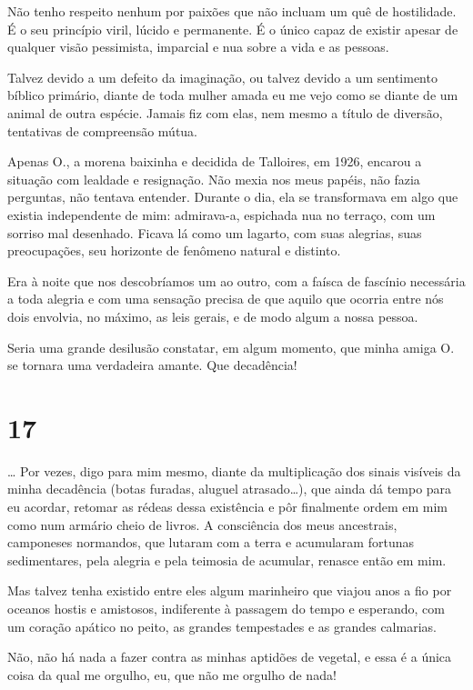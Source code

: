 Não tenho respeito nenhum por paixões que não incluam um quê de
hostilidade. É o seu princípio viril, lúcido e permanente. É o único
capaz de existir apesar de qualquer visão pessimista, imparcial e nua
sobre a vida e as pessoas.

Talvez devido a um defeito da imaginação, ou talvez devido a um
sentimento bíblico primário, diante de toda mulher amada eu me vejo como
se diante de um animal de outra espécie. Jamais fiz com elas, nem mesmo
a título de diversão, tentativas de compreensão mútua.

Apenas O., a morena baixinha e decidida de Talloires, em 1926, encarou a
situação com lealdade e resignação. Não mexia nos meus papéis, não fazia
perguntas, não tentava entender. Durante o dia, ela se transformava em
algo que existia independente de mim: admirava-a, espichada nua no
terraço, com um sorriso mal desenhado. Ficava lá como um lagarto, com
suas alegrias, suas preocupações, seu horizonte de fenômeno natural e
distinto.

Era à noite que nos descobríamos um ao outro, com a faísca de fascínio
necessária a toda alegria e com uma sensação precisa de que aquilo que
ocorria entre nós dois envolvia, no máximo, as leis gerais, e de modo
algum a nossa pessoa.

Seria uma grande desilusão constatar, em algum momento, que minha amiga
O. se tornara uma verdadeira amante. Que decadência!

\section{17}

\ldots{} Por vezes, digo para mim mesmo, diante da multiplicação dos
sinais visíveis da minha decadência (botas furadas, aluguel
atrasado\ldots{}), que ainda dá tempo para eu acordar, retomar as rédeas
dessa existência e pôr finalmente ordem em mim como num armário cheio de
livros. A consciência dos meus ancestrais, camponeses normandos, que
lutaram com a terra e acumularam fortunas sedimentares, pela alegria e
pela teimosia de acumular, renasce então em mim.

Mas talvez tenha existido entre eles algum marinheiro que viajou anos a
fio por oceanos hostis e amistosos, indiferente à passagem do tempo e
esperando, com um coração apático no peito, as grandes tempestades e as
grandes calmarias.

Não, não há nada a fazer contra as minhas aptidões de vegetal, e essa é
a única coisa da qual me orgulho, eu, que não me orgulho de nada!

